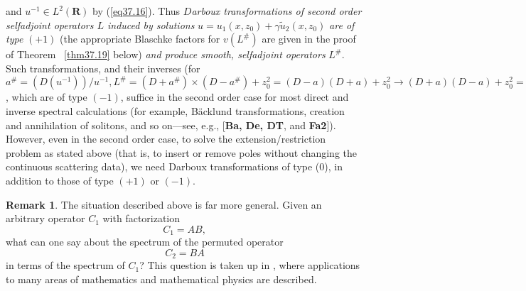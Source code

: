 \documentclass{surv-l}
\theoremstyle{plain}
\theoremstyle{definition}
\newtheorem{remark}[theorem]{Remark}
\numberwithin{equation}{chapter}
\begin{document}
and $u^{-1}\in L^{2}(\mathbf{R})$ by (\ref{eq37.16}). Thus $D$\emph{arboux transformations of second order selfadjoint operators $L$ induced by solutions} $u=u_{1}(x,z_{0})+\gamma\tilde{u}_{2}(x,z_{0})$ \emph{are of type} $(+1)$ (the appropriate Blaschke factors for $v(L^{\#})$ are given in the proof of Theorem ~\ref{thm37.19} below) \emph{and produce smooth, selfadjoint operators} $L^{\#}$. Such transformations, and their inverses (for $a^{\#}=(D(u^{-1}))/u^{-1},L^{\#}=(D+a^{\#}) \times(D-a^{\#})+z_{0}^{2}=(D-a)(D+a)+z_{0}^{2}\rightarrow(D+a)(D-a)+z_{0}^{2}=L)$, which are of type $(-1)$, suffice in the second order case for most direct and inverse spectral calculations (for example, B\"{a}cklund transformations, creation and annihilation of solitons, and so on---see, e.g., [\textbf{Ba, De, DT}, and \textbf{Fa2}]). However, even in the second order case, to solve the extension/restriction problem as stated above (that is, to insert or remove poles without changing the continuous scattering data), we need Darboux transformations of type (0), in addition to those of type $(+1)$ or $(-1)$.
\renewcommand\thetheorem{\thesection.\arabic{theorem}}
\setcounter{section}{37}
\setcounter{theorem}{16}
\begin{remark}\label{rem37.17} The situation described above is far more general. Given an arbitrary operator $C_{1}$ with factorization
\begin{equation*}
C_{1}=AB,
\end{equation*}
what can one say about the spectrum of the permuted operator
\begin{equation*}
C_{2}=BA
\end{equation*}
in terms of the spectrum of $C_{1}$? This question is taken up in \cite{De}, where applications to many areas of mathematics and mathematical physics are described.
\end{remark}
\end{document}
